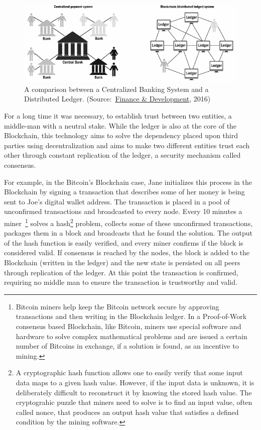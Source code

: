 \begin{figure}[h]
  \centering
  \includegraphics[width=1\linewidth]{imgs/blockchainvscentralizedNetwork.png}
  \caption{\label{fig:centralizedvsdescentralized} A comparison between a
  Centralized Banking System and a Distributed Ledger. (Source:~\href{https://www.imf.org/external/pubs/ft/fandd/}{Finance \& Development}, 2016)}
\end{figure}

For a long time it was necessary, to establish trust between two entities, a
middle-man with a neutral stake. While the ledger is also at the core of the
Blockchain, this technology aims to solve the dependency placed upon third
parties using decentralization and aims to make two different entities trust
each other through constant replication of the ledger, a security mechanism
called consensus.

For example, in the Bitcoin's Blockchain case, Jane initializes this process in
the Blockchain by signing a transaction that describes some of her money is
being sent to Joe's digital wallet address. The transaction is placed in a pool
of unconfirmed transactions and broadcasted to every node. Every 10 minutes a
miner~\footnote{Bitcoin miners help keep the Bitcoin network secure by
approving transactions and then writing in the Blockchain ledger. In a
Proof-of-Work consensus based Blockchain, like Bitcoin, miners use special
software and hardware to solve complex mathematical problems and are issued a
certain number of Bitcoins in exchange, if a solution is found, as an incentive
to mining.} solves a hash\footnote{A cryptographic hash function allows one to
easily verify that some input data maps to a given hash value. However, if the
input data is unknown, it is deliberately difficult to reconstruct it by
knowing the stored hash value. The cryptograhic puzzle that miners need to
solve is to find an input value, often called nonce, that produces an output
hash value that satisfies a defined condition by the mining software.} problem,
collects some of these unconfirmed transactions, packages them in a block and
broadcasts that he found the solution. The output of the hash function is
easily verified, and every miner confirms if the block is considered valid. If
consensus is reached by the nodes, the block is added to the Blockchain
(written in the ledger) and the new state is persisted on all peers through
replication of the ledger. At this point the transaction is confirmed,
requiring no middle man to ensure the transaction is trustworthy and valid.

